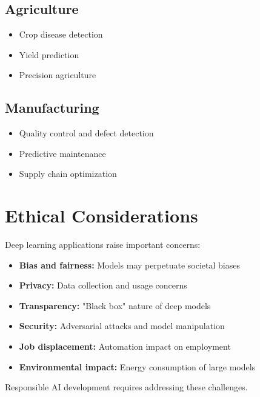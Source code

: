 \subsection{Agriculture}

\begin{itemize}
    \item Crop disease detection
    \item Yield prediction
    \item Precision agriculture
\end{itemize}

\subsection{Manufacturing}

\begin{itemize}
    \item Quality control and defect detection
    \item Predictive maintenance
    \item Supply chain optimization
\end{itemize}

\section{Ethical Considerations}
\label{sec:ethics}

Deep learning applications raise important concerns:

\begin{itemize}
    \item \textbf{Bias and fairness:} Models may perpetuate societal biases
    \item \textbf{Privacy:} Data collection and usage concerns
    \item \textbf{Transparency:} "Black box" nature of deep models
    \item \textbf{Security:} Adversarial attacks and model manipulation
    \item \textbf{Job displacement:} Automation impact on employment
    \item \textbf{Environmental impact:} Energy consumption of large models
\end{itemize}

Responsible AI development requires addressing these challenges.
